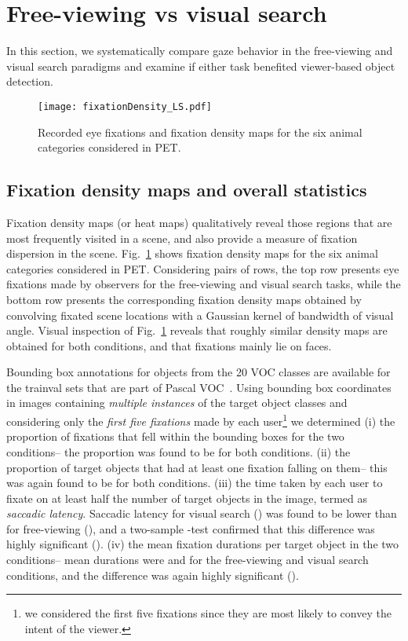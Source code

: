 \documentclass{article}
\begin{document}
\section{Free-viewing vs visual search}\label{SA}
In this section, we systematically compare gaze behavior in the free-viewing and visual search paradigms and examine if either task benefited viewer-based object detection. 

\begin{figure}[htbp]
\texttt{[image: fixationDensity\_LS.pdf]}\vspace{-.05in}
\caption{Recorded eye fixations and fixation density maps for the six animal categories considered in PET.}
\label{fig:fixdens}
\end{figure}
\vspace{-.1in}
\subsection{Fixation density maps and overall statistics}

Fixation density maps (or heat maps) qualitatively reveal those regions that are most frequently visited in a scene, and also provide a measure of fixation dispersion in the scene. Fig.~\ref{fig:fixdens} shows fixation density maps for the six animal categories considered in PET. Considering pairs of rows, the top row presents eye fixations made by observers for the free-viewing and visual search tasks, while the bottom row presents the corresponding fixation density maps obtained by convolving fixated scene locations with a Gaussian kernel of bandwidth of  visual angle. Visual inspection of Fig.~\ref{fig:fixdens} reveals that roughly similar density maps are obtained for both conditions, and that fixations mainly lie on faces.



Bounding box annotations for objects from the 20 VOC classes are available for the trainval sets that are part of Pascal VOC~\cite{pascalvoc2012}. Using bounding box coordinates in images containing \textit{multiple instances} of the target object classes and considering only the \textit{first five fixations} made by each user\footnote{we considered the first five fixations since they are most likely to convey the intent of the viewer.} we determined (i) the proportion of fixations that fell within the bounding boxes for the two conditions-- the proportion was  found to be  for both conditions. (ii) the proportion of target objects that had at least one fixation falling on them-- this was again found to be   for both conditions. (iii) the time taken by each user to fixate on at least half the number of target objects in the image, termed as \textit{saccadic latency}. Saccadic latency for visual search () was found to be lower than for free-viewing (), and a two-sample -test confirmed that this difference was highly significant (). (iv) the mean fixation durations per target object in the two conditions-- mean durations were  and  for the free-viewing and visual search conditions, and the difference was again highly significant ().
\end{document}

